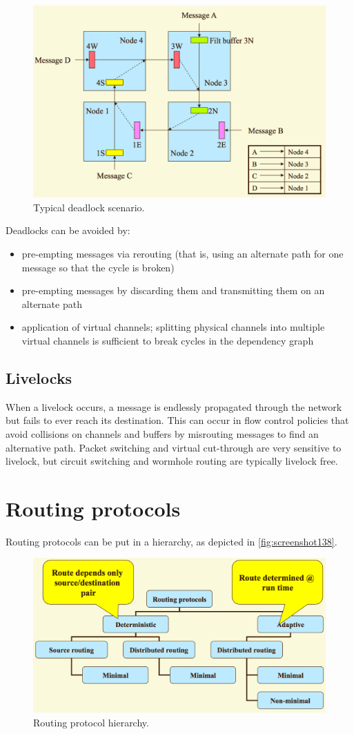 \begin{figure}
\centering
\includegraphics[width=0.7\linewidth]{figures/screenshot137}
\caption{Typical deadlock scenario.}
\label{fig:screenshot137}
\end{figure}

Deadlocks can be avoided by: \begin{itemize}
\item pre-empting messages via rerouting (that is, using an alternate path for one message so that the cycle is broken)
\item pre-empting messages by discarding them and transmitting them on an alternate path
\item application of virtual channels; splitting physical channels into multiple virtual channels is sufficient to break cycles in the dependency graph
\end{itemize}

\subsection{Livelocks}
When a livelock occurs, a message is endlessly propagated through the network but fails to ever reach its destination. This can occur in flow control policies that avoid collisions on channels and buffers by misrouting messages to find an alternative path. Packet switching and virtual cut-through are very sensitive to livelock, but circuit switching and wormhole routing are typically livelock free.

\section{Routing protocols}
Routing protocols can be put in a hierarchy, as depicted in \autoref{fig:screenshot138}.

\begin{figure}
\centering
\includegraphics[width=0.7\linewidth]{figures/screenshot138}
\caption{Routing protocol hierarchy.}
\label{fig:screenshot138}
\end{figure}

